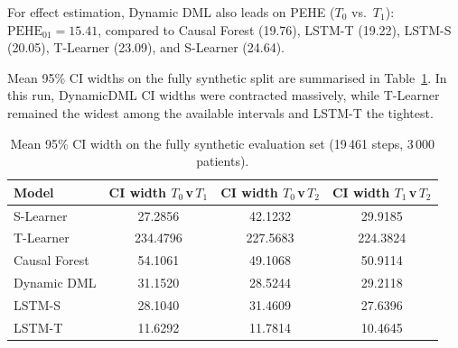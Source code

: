 \documentclass{article}
\begin{document}
For effect estimation, Dynamic DML also leads on PEHE ($T_0$ vs.\ $T_1$):
$\text{PEHE}_{01} = 15.41$, compared to Causal Forest (19.76), LSTM-T (19.22),
LSTM-S (20.05), T-Learner (23.09), and S-Learner (24.64).

Mean 95\% CI widths on the fully synthetic split are summarised in
Table~\ref{tab:synth_ci_width}. In this run, DynamicDML CI widths were contracted massively, while T-Learner remained the widest among the
available intervals and LSTM-T the tightest.

\begin{table}[H]
    \centering
    \begin{tabular}{lccc}
        \toprule
        \textbf{Model} & \textbf{CI width $T_0$\,v\,$T_1$} & \textbf{CI width $T_0$\,v\,$T_2$} & \textbf{CI width $T_1$\,v\,$T_2$} \\
        \midrule
        S-Learner     & 27.2856 & 42.1232 & 29.9185 \\
        T-Learner     & 234.4796 & 227.5683 & 224.3824 \\
        Causal Forest & 54.1061 & 49.1068 & 50.9114 \\
        Dynamic DML   & 31.1520 & 28.5244 & 29.2118 \\
        LSTM-S        & 28.1040 & 31.4609 & 27.6396 \\
        LSTM-T        & 11.6292 & 11.7814 & 10.4645 \\
        \bottomrule
    \end{tabular}
    \caption{Mean 95\% CI width on the fully synthetic evaluation set (19\,461 steps, 3\,000 patients).}
    \label{tab:synth_ci_width}
\end{table}
\end{document}
